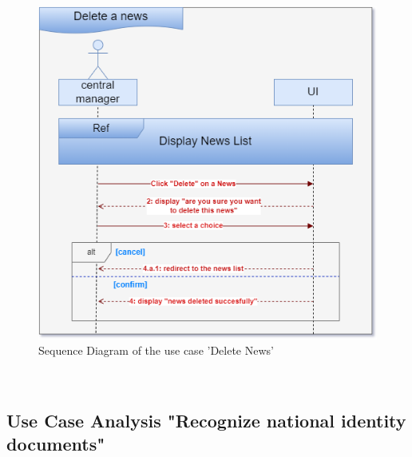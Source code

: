 \begin{figure}[h]
    \centering
    \includegraphics[width=1\textwidth]{figures/seq delete a news.png}
    \caption{Sequence Diagram of the use case 'Delete News'}
\end{figure}\
\clearpage

\subsection{Use Case Analysis "Recognize national identity documents"}
